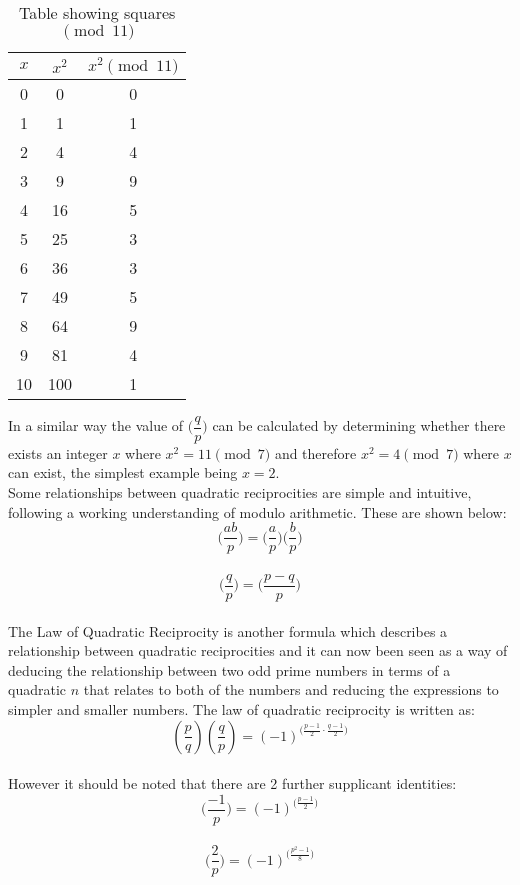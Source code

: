 \documentclass{article}
\begin{document}
\begin{table}[h!]
\begin{center}
\begin{tabular}{ |c|c|c| } 
 \hline
 $x$ & $x^2$ & $x^2 \pmod{11}$ \\
 \hline
 0 & 0 & 0 \\
 1 & 1 & 1 \\
 2 & 4 & 4 \\
 3 & 9 & 9 \\
 4 & 16 & 5 \\
 5 & 25 & 3 \\
 6 & 36 & 3 \\
 7 & 49 & 5 \\
 8 & 64 & 9 \\
 9 & 81 & 4 \\
 10 & 100 & 1 \\
 \hline
\end{tabular}
\end{center}
\caption{Table showing squares $\pmod{11}$}
\label{tablelqr}
\end{table}

In a similar way the value of $\bigg( \dfrac{q}{p}\bigg)$ can be calculated by determining whether there exists an integer $x$ where $x^2 = 11 \pmod{7}$ and therefore $x^2 = 4 \pmod{7}$ where $x$ can exist, the simplest example being $x=2$.
\\
Some relationships between quadratic reciprocities are simple and intuitive, following a working understanding of modulo arithmetic. These are shown below:
\[\bigg( \dfrac{ab}{p} \bigg) = \bigg( \dfrac{a}{p} \bigg) \bigg( \dfrac{b}{p} \bigg)\] \\
\[\bigg( \dfrac{q}{p} \bigg) = \bigg( \dfrac{p-q}{p} \bigg)\] \cite{lawqr}\\
The Law of Quadratic Reciprocity is another formula which describes a relationship between quadratic reciprocities and it can now been seen as a way of deducing the relationship between two odd prime numbers in terms of a quadratic $n$ that relates to both of the numbers and reducing the expressions to simpler and smaller numbers. The law of quadratic reciprocity is written as: 
\begin{equation}
\label{lqr}
\left(\frac{p}{q}\right) \left(\frac{q}{p} \right) = (-1)^{\bigg(\displaystyle \frac{p-1}{2}\cdot\frac{q-1}{2}\bigg)}
\end{equation}
\\
However it should be noted that there are 2 further supplicant  identities\cite{lawqr}:
\begin{equation}
\label{firststated}
    \bigg( \dfrac{-1}{p} \bigg) = (-1)^{\bigg(\displaystyle \frac{p-1}{2}\bigg)}
\end{equation}
\\
\begin{equation}
\label{secondstated}
    \bigg( \dfrac{2}{p} \bigg) = (-1)^{\bigg(\displaystyle \frac{p^2-1}{8}\bigg)} 
\end{equation}
\end{document}
